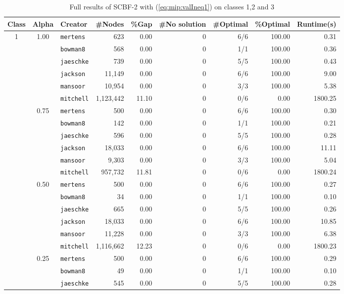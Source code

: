 \begin{table}[tpb]
	\tiny
	\caption{Full results of SCBF-2 with (\ref{eq:mip:valIneq1}) on classes 1,2 and 3}
	\centering
	\vspace{2mm}
	\begin{tabular}{cclrrrrrr}
		\toprule
		Class & Alpha & Creator & \#Nodes & \%Gap & \#No solution & \#Optimal & \%Optimal & Runtime(s) \\\midrule\midrule
		1 & 1.00 & {\tt mertens}	& 623 & 0.00 & 0 & 6/6 & 100.00 & 0.31 \\
		&		& {\tt bowman8}	& 568 & 0.00 & 0 & 1/1 & 100.00 & 0.36 \\
		&		& {\tt jaeschke}	& 739 & 0.00 & 0 & 5/5 & 100.00 & 0.43 \\
		&		& {\tt jackson}	& 11,149 & 0.00 & 0 & 6/6 & 100.00 & 9.00 \\
		&		& {\tt mansoor}	& 10,954 & 0.00 & 0 & 3/3 & 100.00 & 5.38 \\
		&		& {\tt mitchell}	& 1,123,442 & 11.10 & 0 & 0/6 & 0.00 & 1800.25 \\
		& 0.75	& {\tt mertens}	& 500 & 0.00 & 0 & 6/6 & 100.00 & 0.30 \\
		&		& {\tt bowman8}	& 142 & 0.00 & 0 & 1/1 & 100.00 & 0.21 \\
		&		& {\tt jaeschke}	& 596 & 0.00 & 0 & 5/5 & 100.00 & 0.28 \\
		&		& {\tt jackson}	& 18,033 & 0.00 & 0 & 6/6 & 100.00 & 11.11 \\
		&		& {\tt mansoor}	& 9,303 & 0.00 & 0 & 3/3 & 100.00 & 5.04 \\
		&		& {\tt mitchell}	& 957,732 & 11.81 & 0 & 0/6 & 0.00 & 1800.24 \\
		& 0.50	& {\tt mertens}	& 500 & 0.00 & 0 & 6/6 & 100.00 & 0.27 \\
		&		& {\tt bowman8}	& 34 & 0.00 & 0 & 1/1 & 100.00 & 0.10 \\
		&		& {\tt jaeschke}	& 665 & 0.00 & 0 & 5/5 & 100.00 & 0.26 \\
		&		& {\tt jackson}	& 18,033 & 0.00 & 0 & 6/6 & 100.00 & 10.85 \\
		&		& {\tt mansoor}	& 11,228 & 0.00 & 0 & 3/3 & 100.00 & 6.38 \\
		&		& {\tt mitchell}	& 1,116,662 & 12.23 & 0 & 0/6 & 0.00 & 1800.23 \\
		& 0.25	& {\tt mertens}	& 500 & 0.00 & 0 & 6/6 & 100.00 & 0.29 \\
		&		& {\tt bowman8}	& 49 & 0.00 & 0 & 1/1 & 100.00 & 0.10 \\
		&		& {\tt jaeschke}	& 545 & 0.00 & 0 & 5/5 & 100.00 & 0.28 \\

\end{tabular}
\end{table}

